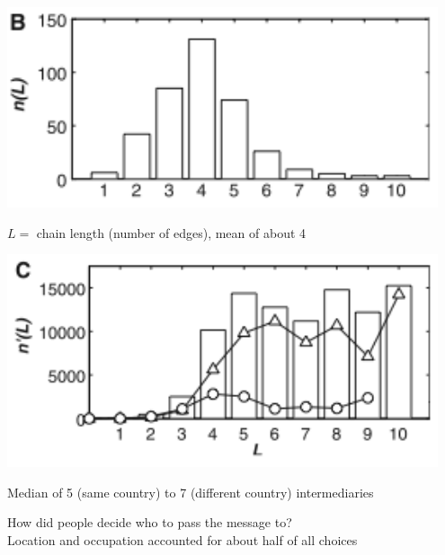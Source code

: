 \documentclass[aspectratio=169]{beamer}
\begin{document}
\begin{frame}

\begin{center}
\includegraphics[width = 0.95\textwidth]{figures/dodds_experimental_2003_fig2b}
\end{center}

\vfill
$L =$ chain length (number of edges), mean of about 4


\end{frame}
\begin{frame}

\begin{center}
\includegraphics[width = 0.95\textwidth]{figures/dodds_experimental_2003_fig2c}
\end{center}

\vfill
Median of 5 (same country) to 7 (different country) intermediaries


\end{frame}
\begin{frame}

How did people decide who to pass the message to?\\

Location and occupation accounted for about half of all choices


\end{frame}
\end{document}
